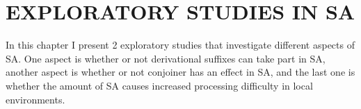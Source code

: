 \chapter{\MakeUppercase{Exploratory Studies in SA}}

In this chapter I present 2 exploratory studies that investigate different aspects of SA. One aspect is whether or not derivational suffixes can take part in SA, another aspect is whether or not conjoiner has an effect in SA, and the last one is whether the amount of SA causes increased processing difficulty in local environments.



